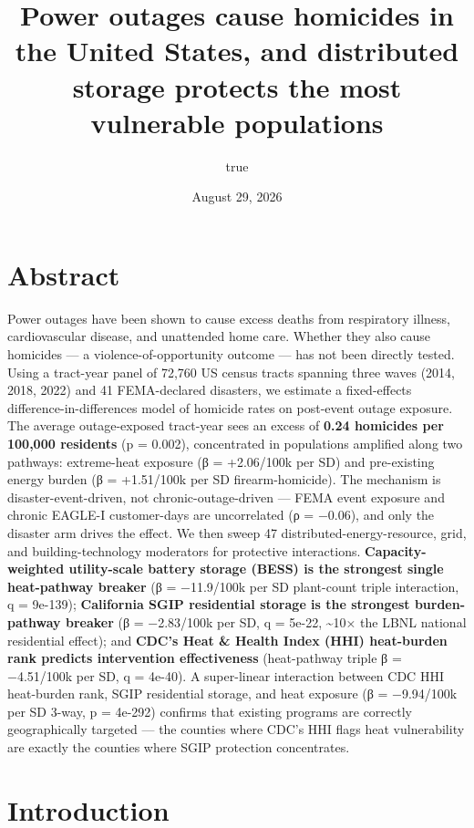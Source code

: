 \documentclass[
]{article}
\title{Power outages cause homicides in the United States, and
distributed storage protects the most vulnerable populations}
\author{true}
\date{August 29, 2026}
\begin{document}
\maketitle

\hypertarget{abstract}{%
\section{Abstract}\label{abstract}}

Power outages have been shown to cause excess deaths from respiratory
illness, cardiovascular disease, and unattended home care. Whether they
also cause homicides --- a violence-of-opportunity outcome --- has not
been directly tested. Using a tract-year panel of 72,760 US census
tracts spanning three waves (2014, 2018, 2022) and 41 FEMA-declared
disasters, we estimate a fixed-effects difference-in-differences model
of homicide rates on post-event outage exposure. The average
outage-exposed tract-year sees an excess of \textbf{0.24 homicides per
100,000 residents} (p = 0.002), concentrated in populations amplified
along two pathways: extreme-heat exposure (β = +2.06/100k per SD) and
pre-existing energy burden (β = +1.51/100k per SD firearm-homicide). The
mechanism is disaster-event-driven, not chronic-outage-driven --- FEMA
event exposure and chronic EAGLE-I customer-days are uncorrelated (ρ =
−0.06), and only the disaster arm drives the effect. We then sweep 47
distributed-energy-resource, grid, and building-technology moderators
for protective interactions. \textbf{Capacity-weighted utility-scale
battery storage (BESS) is the strongest single heat-pathway breaker} (β
= −11.9/100k per SD plant-count triple interaction, q = 9e-139);
\textbf{California SGIP residential storage is the strongest
burden-pathway breaker} (β = −2.83/100k per SD, q = 5e-22,
\textasciitilde10× the LBNL national residential effect); and
\textbf{CDC's Heat \& Health Index (HHI) heat-burden rank predicts
intervention effectiveness} (heat-pathway triple β = −4.51/100k per SD,
q = 4e-40). A super-linear interaction between CDC HHI heat-burden rank,
SGIP residential storage, and heat exposure (β = −9.94/100k per SD
3-way, p = 4e-292) confirms that existing programs are correctly
geographically targeted --- the counties where CDC's HHI flags heat
vulnerability are exactly the counties where SGIP protection
concentrates.

\hypertarget{introduction}{%
\section{Introduction}\label{introduction}}
\end{document}
